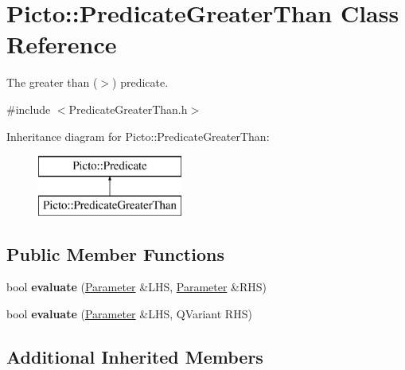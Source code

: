 \hypertarget{class_picto_1_1_predicate_greater_than}{\section{Picto\-:\-:Predicate\-Greater\-Than Class Reference}
\label{class_picto_1_1_predicate_greater_than}
}


The greater than ($>$) predicate.  




{\ttfamily \#include $<$Predicate\-Greater\-Than.\-h$>$}

Inheritance diagram for Picto\-:\-:Predicate\-Greater\-Than\-:\begin{figure}[H]
\begin{center}
\leavevmode
\includegraphics[height=2.000000cm]{class_picto_1_1_predicate_greater_than}
\end{center}
\end{figure}
\subsection*{Public Member Functions}
\begin{DoxyCompactItemize}
\item 
\hypertarget{class_picto_1_1_predicate_greater_than_a48b32d04b7da0e3e5b4f4744d45c2cad}{bool {\bfseries evaluate} (\hyperlink{class_picto_1_1_parameter}{Parameter} \&L\-H\-S, \hyperlink{class_picto_1_1_parameter}{Parameter} \&R\-H\-S)}\label{class_picto_1_1_predicate_greater_than_a48b32d04b7da0e3e5b4f4744d45c2cad}

\item 
\hypertarget{class_picto_1_1_predicate_greater_than_a1e9298e060a46c82b71b21f59df3fd12}{bool {\bfseries evaluate} (\hyperlink{class_picto_1_1_parameter}{Parameter} \&L\-H\-S, Q\-Variant R\-H\-S)}\label{class_picto_1_1_predicate_greater_than_a1e9298e060a46c82b71b21f59df3fd12}

\end{DoxyCompactItemize}
\subsection*{Additional Inherited Members}


